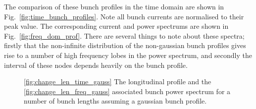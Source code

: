 The comparison of these bunch profiles in the time domain are shown in Fig.~\ref{fig:time_bunch_profiles}. Note all bunch currents are normalised to their peak value. The corresponding current and power spectrums are shown in Fig.~\ref{fig:freq_dom_prof}. There are several things to note about these spectra; firstly that the non-infinite distribution of the non-gaussian bunch profiles gives rise to a number of high frequency lobes in the power spectrum, and secondly the interval of these nodes depends heavily on the bunch profile.

\begin{figure}
\caption{\ref{fig:change_len_time_gauss} The longitudinal profile and the \ref{fig:change_len_freq_gauss} associated bunch power spectrum for a number of bunch lengths assuming a gaussian bunch profile.}
\label{fig:diff_bunch_len_gauss}
\end{figure}

